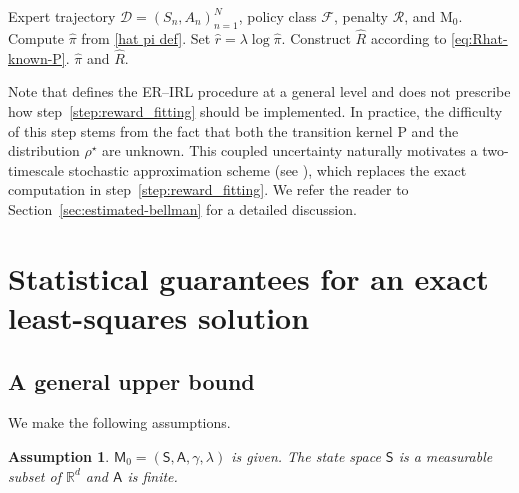 \documentclass{article}
\theoremstyle{definition}
\theoremstyle{remark}
\theoremstyle{plain}
\newtheorem{assumption}[proposition]{Assumption}
\newcommand{\MKQ}{\mathrm{P}}
\def\rset{\mathbb{R}}
\newcommand{\ERIRL}{\textsc{ER--IRL}}
\numberwithin{equation}{section}
\begin{document}
\begin{algorithm}[H]
\caption{Population \ERIRL\ reconstruction}
\label{alg:er-irl}
\begin{algorithmic}[1]
\Require Expert trajectory $\mathcal D = (S_n,A_n)_{n=1}^N$, policy class $\mathcal F$, penalty $\mathcal R$, and $\mathrm M_0$.
\State Compute $\widehat\pi$ from \eqref{hat pi def}.
\State Set $\widehat r=\lambda\log\widehat\pi$.
\State
\label{step:reward_fitting}
Construct $\widehat R$ according to \eqref{eq:Rhat-known-P}.
\State \Return $\widehat\pi$ and $\widehat R$.
\end{algorithmic}
\end{algorithm}

Note that  defines the \ERIRL{} procedure at a general level and does not prescribe how step~\ref{step:reward_fitting} should be implemented. In practice, the difficulty of this step stems from the fact that both the transition kernel \(\MKQ\) and the distribution \(\rho^\star\) are unknown. This coupled uncertainty naturally motivates a two-timescale stochastic approximation scheme (see ), which replaces the exact computation in step~\ref{step:reward_fitting}.
We refer the reader to Section~\ref{sec:estimated-bellman} for a detailed discussion.

\section{Statistical guarantees for an exact least-squares solution}
\label{sec:convergence}
\subsection{A general upper bound}
\label{subsec:general-oracle}
We make the following assumptions.

\begin{assumption}
    \label{assum: MDP}
    \(\mathsf{M}_0 = (\mathsf{S}, \mathsf{A}, \gamma, \lambda)\) is given. The state space \(\mathsf S\) is a  measurable subset of $\rset^d$ and $\mathsf{A}$ is finite. 
\end{assumption}
\end{document}

